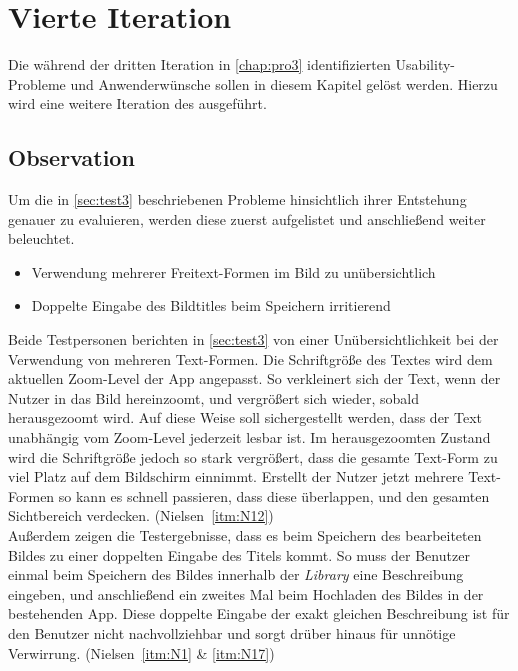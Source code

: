 \chapter{Vierte Iteration}
Die während der dritten Iteration in \autoref{chap:pro3} identifizierten Usability-Probleme und Anwenderwünsche sollen in diesem Kapitel gelöst werden.
Hierzu wird eine weitere Iteration des \hcdp{} ausgeführt.

\section{Observation}
Um die in \autoref{sec:test3} beschriebenen Probleme hinsichtlich ihrer Entstehung genauer zu evaluieren, werden diese zuerst aufgelistet und anschließend weiter beleuchtet.

\begin{itemize}
  \item Verwendung mehrerer Freitext-Formen im Bild zu unübersichtlich
  \item Doppelte Eingabe des Bildtitles beim Speichern irritierend
\end{itemize}

\noindent
Beide Testpersonen berichten in \autoref{sec:test3} von einer Unübersichtlichkeit bei der Verwendung von mehreren Text-Formen.
Die Schriftgröße des Textes wird dem aktuellen Zoom-Level der App angepasst.
So verkleinert sich der Text, wenn der Nutzer in das Bild hereinzoomt, und vergrößert sich wieder, sobald herausgezoomt wird.
Auf diese Weise soll sichergestellt werden, dass der Text unabhängig vom Zoom-Level jederzeit lesbar ist.
Im herausgezoomten Zustand wird die Schriftgröße jedoch so stark vergrößert, dass die gesamte Text-Form zu viel Platz auf dem Bildschirm einnimmt.
Erstellt der Nutzer jetzt mehrere Text-Formen so kann es schnell passieren, dass diese überlappen, und den gesamten Sichtbereich verdecken.
(Nielsen~\autoref{itm:N12}) \\ 

Außerdem zeigen die Testergebnisse, dass es beim Speichern des bearbeiteten Bildes zu einer doppelten Eingabe des Titels kommt.
So muss der Benutzer einmal beim Speichern des Bildes innerhalb der \emph{Library} eine Beschreibung eingeben, und anschließend ein zweites Mal beim Hochladen des Bildes in der bestehenden App.
Diese doppelte Eingabe der exakt gleichen Beschreibung ist für den Benutzer nicht nachvollziehbar und sorgt drüber hinaus für unnötige Verwirrung.
(Nielsen~\autoref{itm:N1} \& \autoref{itm:N17}) \\ 

